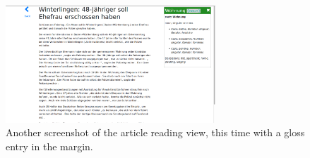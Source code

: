 \begin{figure}
	\caption[Screenshot of the Article Reading View with Gloss]{Another screenshot of the article reading view, this time with a gloss entry in the margin.}
	\label{fig:view4}
	\begin{center}
	\includegraphics[width=0.7\textwidth]{Graphics/View4}
\end{center}
\end{figure}